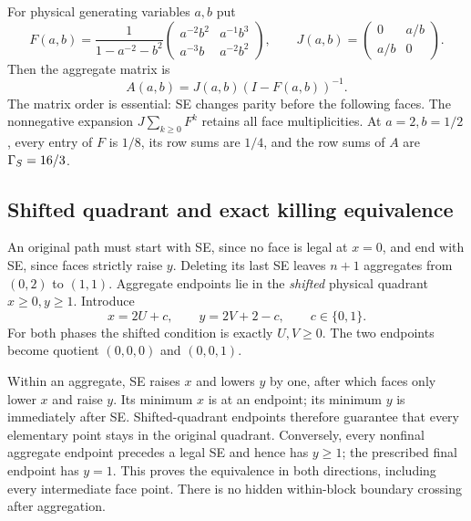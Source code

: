 \documentclass[11pt,letterpaper]{article}
\numberwithin{equation}{section}
\theoremstyle{remark}\newtheorem{remark}[theorem]{Remark}
\begin{document}
For physical generating variables $a,b$ put
\begin{equation}\label{cps:log:eq:FJ}
 F(a,b)=\frac1{1-a^{-2}-b^2}
 \begin{pmatrix}a^{-2}b^2&a^{-1}b^3\\a^{-3}b&a^{-2}b^2\end{pmatrix},
 \qquad J(a,b)=\begin{pmatrix}0&a/b\\a/b&0\end{pmatrix}.
\end{equation}
Then the aggregate matrix is
\begin{equation}\label{cps:log:eq:aggregate}
 A(a,b)=J(a,b)(I-F(a,b))^{-1}.
\end{equation}
The matrix order is essential: SE changes parity before the following
faces. The nonnegative expansion $J\sum_{k\ge0}F^k$ retains all
face multiplicities. At $a=2,b=1/2$, every entry of $F$ is $1/8$,
its row sums are $1/4$, and the row sums of $A$ are $\Gamma_S=16/3$.

\subsection{Shifted quadrant and exact killing equivalence}
An original path must start with SE, since no face is legal at $x=0$,
and end with SE, since faces strictly raise $y$. Deleting its last
SE leaves $n+1$ aggregates from $(0,2)$ to $(1,1)$.
Aggregate endpoints lie in the \emph{shifted} physical quadrant
$x\ge0,y\ge1$. Introduce
\begin{equation}\label{cps:log:eq:Squot}
 x=2U+c,\qquad y=2V+2-c,\qquad c\in\{0,1\}.
\end{equation}
For both phases the shifted condition is exactly $U,V\ge0$.
The two endpoints become quotient $(0,0,0)$ and $(0,0,1)$.

Within an aggregate, SE raises $x$ and lowers $y$ by one, after which
faces only lower $x$ and raise $y$. Its minimum $x$ is at an endpoint;
its minimum $y$ is immediately after SE. Shifted-quadrant endpoints
therefore guarantee that every elementary point stays in the original
quadrant. Conversely, every nonfinal aggregate endpoint precedes a
legal SE and hence has $y\ge1$; the prescribed final endpoint has
$y=1$. This proves the equivalence in both directions, including every
intermediate face point. There is no hidden within-block boundary
crossing after aggregation.
\end{document}
